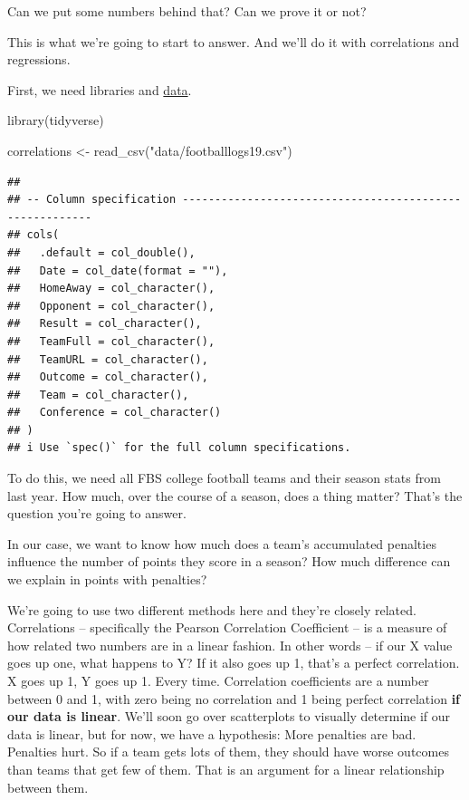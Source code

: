 \documentclass[
]{book}
\newenvironment{Shaded}{\begin{snugshade}}{\end{snugshade}}
\newcommand{\FunctionTok}[1]{\textcolor[rgb]{0.00,0.00,0.00}{#1}}
\newcommand{\NormalTok}[1]{#1}
\newcommand{\OtherTok}[1]{\textcolor[rgb]{0.56,0.35,0.01}{#1}}
\newcommand{\StringTok}[1]{\textcolor[rgb]{0.31,0.60,0.02}{#1}}
\begin{document}
Can we put some numbers behind that? Can we prove it or not?

This is what we're going to start to answer. And we'll do it with correlations and regressions.

First, we need libraries and \href{https://unl.box.com/s/2prgq48ctoxlukn6kmfjw0u1opda5s0m}{data}.

\begin{Shaded}
\begin{Highlighting}[]
\FunctionTok{library}\NormalTok{(tidyverse)}
\end{Highlighting}
\end{Shaded}

\begin{Shaded}
\begin{Highlighting}[]
\NormalTok{correlations }\OtherTok{\textless{}{-}} \FunctionTok{read\_csv}\NormalTok{(}\StringTok{"data/footballlogs19.csv"}\NormalTok{)}
\end{Highlighting}
\end{Shaded}

\begin{verbatim}
## 
## -- Column specification --------------------------------------------------------
## cols(
##   .default = col_double(),
##   Date = col_date(format = ""),
##   HomeAway = col_character(),
##   Opponent = col_character(),
##   Result = col_character(),
##   TeamFull = col_character(),
##   TeamURL = col_character(),
##   Outcome = col_character(),
##   Team = col_character(),
##   Conference = col_character()
## )
## i Use `spec()` for the full column specifications.
\end{verbatim}

To do this, we need all FBS college football teams and their season stats from last year. How much, over the course of a season, does a thing matter? That's the question you're going to answer.

In our case, we want to know how much does a team's accumulated penalties influence the number of points they score in a season? How much difference can we explain in points with penalties?

We're going to use two different methods here and they're closely related. Correlations -- specifically the Pearson Correlation Coefficient -- is a measure of how related two numbers are in a linear fashion. In other words -- if our X value goes up one, what happens to Y? If it also goes up 1, that's a perfect correlation. X goes up 1, Y goes up 1. Every time. Correlation coefficients are a number between 0 and 1, with zero being no correlation and 1 being perfect correlation \textbf{if our data is linear}. We'll soon go over scatterplots to visually determine if our data is linear, but for now, we have a hypothesis: More penalties are bad. Penalties hurt. So if a team gets lots of them, they should have worse outcomes than teams that get few of them. That is an argument for a linear relationship between them.
\end{document}
